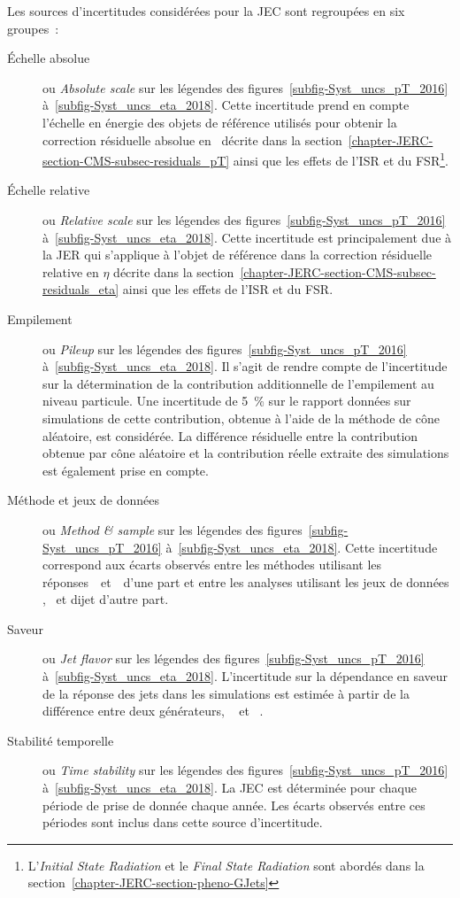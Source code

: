 Les sources d'incertitudes considérées pour la JEC sont regroupées en six groupes~\cite{CMS-DP-2020-019}:
\begin{description}
\item[Échelle absolue] ou \emph{Absolute scale} sur les légendes des figures~\ref{subfig-Syst_uncs_pT_2016} à~\ref{subfig-Syst_uncs_eta_2018}.
Cette incertitude prend en compte l'échelle en énergie des objets de référence utilisés pour obtenir la correction résiduelle absolue en \pT\ décrite dans la section~\ref{chapter-JERC-section-CMS-subsec-residuals_pT} ainsi que les effets de l'ISR et du FSR\footnote{L'\emph{Initial State Radiation} et le \emph{Final State Radiation} sont abordés dans la section~\ref{chapter-JERC-section-pheno-GJets}}.
\item[Échelle relative] ou \emph{Relative scale} sur les légendes des figures~\ref{subfig-Syst_uncs_pT_2016} à~\ref{subfig-Syst_uncs_eta_2018}.
Cette incertitude est principalement due à la JER qui s'applique à l'objet de référence dans la correction résiduelle relative en $\eta$ décrite dans la section~\ref{chapter-JERC-section-CMS-subsec-residuals_eta} ainsi que les effets de l'ISR et du FSR.
\item[Empilement] ou \emph{Pileup} sur les légendes des figures~\ref{subfig-Syst_uncs_pT_2016} à~\ref{subfig-Syst_uncs_eta_2018}.
Il s'agit de rendre compte de l'incertitude sur la détermination de la contribution additionnelle de l'empilement au niveau particule.
Une incertitude de \SI{5}{\%} sur le rapport données sur simulations de cette contribution, obtenue à l'aide de la méthode de cône aléatoire, est considérée.
La différence résiduelle entre la contribution obtenue par cône aléatoire et la contribution réelle extraite des simulations est également prise en compte.
\item[Méthode et jeux de données] ou \emph{Method \& sample} sur les légendes des figures~\ref{subfig-Syst_uncs_pT_2016} à~\ref{subfig-Syst_uncs_eta_2018}.
Cette incertitude correspond aux écarts observés entre les méthodes utilisant les réponses~\Rbal\ et~\RMPF\ d'une part et entre les analyses utilisant les jeux de données \Zjets, \Gjets\ et dijet d'autre part.
\item[Saveur] ou \emph{Jet flavor} sur les légendes des figures~\ref{subfig-Syst_uncs_pT_2016} à~\ref{subfig-Syst_uncs_eta_2018}.
L'incertitude sur la dépendance en saveur de la réponse des jets dans les simulations est estimée à partir de la différence entre deux générateurs,
\PYTHIA~\cite{pythia6.4}
et
\HERWIG~\cite{herwig}.
\item[Stabilité temporelle] ou \emph{Time stability} sur les légendes des figures~\ref{subfig-Syst_uncs_pT_2016} à~\ref{subfig-Syst_uncs_eta_2018}.
La JEC est déterminée pour chaque période de prise de donnée chaque année. Les écarts observés entre ces périodes sont inclus dans cette source d'incertitude.
\end{description}
